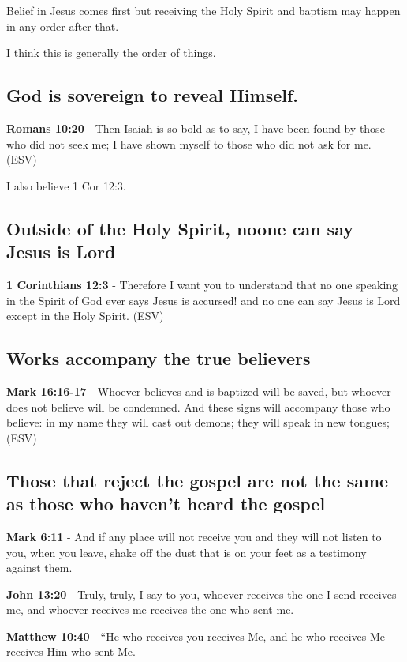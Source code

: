 \documentclass[11pt]{article}
\begin{document}
Belief in Jesus comes first but receiving the Holy Spirit and baptism may happen in any order after that.

I think this is generally the order of things.

\subsection{God is sovereign to reveal Himself.}
\label{sec:org7898165}

\textbf{Romans 10:20} - Then Isaiah is so bold as to say, I have been found by those who did not seek me; I have shown myself to those who did not ask for me. (ESV)

I also believe 1 Cor 12:3.

\subsection{Outside of the Holy Spirit, noone can say Jesus is Lord}
\label{sec:org2a065b5}

\textbf{1 Corinthians 12:3} - Therefore I want you to understand that no one speaking in the Spirit of God ever says Jesus is accursed! and no one can say Jesus is Lord except in the Holy Spirit. (ESV)

\subsection{Works accompany the true believers}
\label{sec:orgef437d8}
\textbf{Mark 16:16-17} - Whoever believes and is baptized will be saved, but whoever does not believe will be condemned. And these signs will accompany those who believe: in my name they will cast out demons; they will speak in new tongues; (ESV)

\subsection{Those that reject the gospel are not the same as those who haven't heard the gospel}
\label{sec:org59ab2ca}
\textbf{Mark 6:11} - And if any place will not receive you and they will not listen to you, when you leave, shake off the dust that is on your feet as a testimony against them.

\textbf{John 13:20} - Truly, truly, I say to you, whoever receives the one I send receives me, and whoever receives me receives the one who sent me.

\textbf{Matthew 10:40} - “He who receives you receives Me, and he who receives Me receives Him who sent Me.
\end{document}
